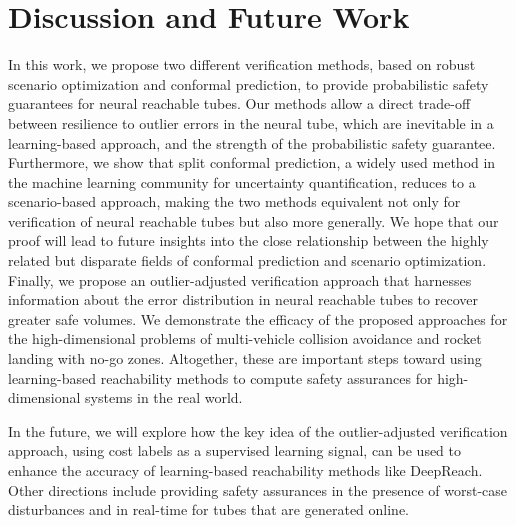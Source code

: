 \section{Discussion and Future Work}
\vspace{-0.5em}
In this work, we propose two different verification methods, based on robust scenario optimization and conformal prediction, to provide probabilistic safety guarantees for neural reachable tubes.
Our methods allow a direct trade-off between resilience to outlier errors in the neural tube, which are inevitable in a learning-based approach, and the strength of the probabilistic safety guarantee.
Furthermore, we show that split conformal prediction, a widely used method in the machine learning community for uncertainty quantification, reduces to a scenario-based approach, making the two methods equivalent not only for verification of neural reachable tubes but also more generally.
We hope that our proof will lead to future insights into the close relationship between the highly related but disparate fields of conformal prediction and scenario optimization.
Finally, we propose an outlier-adjusted verification approach that harnesses information about the error distribution in neural reachable tubes to recover greater safe volumes.
We demonstrate the efficacy of the proposed approaches for the high-dimensional problems of multi-vehicle collision avoidance and rocket landing with no-go zones.
Altogether, these are important steps toward using learning-based reachability methods to compute safety assurances for high-dimensional systems in the real world.

In the future, we will explore how the key idea of the outlier-adjusted verification approach, using cost labels as a supervised learning signal, can be used to enhance the accuracy of learning-based reachability methods like DeepReach.
Other directions include providing safety assurances in the presence of worst-case disturbances and in real-time for tubes that are generated online.
